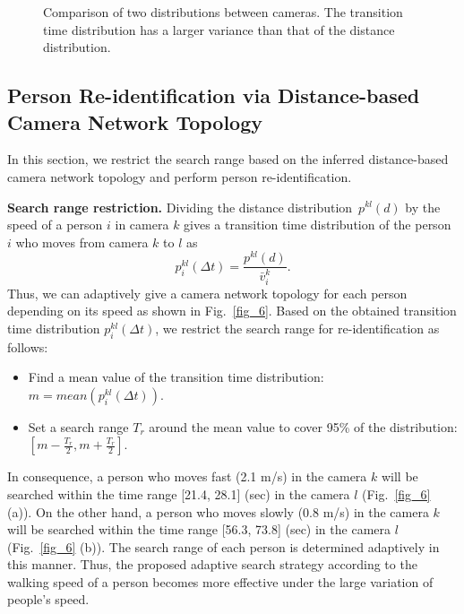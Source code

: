 \documentclass[10pt,twocolumn,letterpaper]{article}
\begin{document}
	
	\begin{figure}[t]	
		\centering
		\caption{Comparison of two distributions between cameras. The transition time distribution has a larger variance than that of the distance distribution.}
		\label{fig_5}
		
	\end{figure}
	
	
	\subsection{Person Re-identification via Distance-based Camera Network Topology}
	\label{subsec:re_id}
	
	In this section, we restrict the search range based on the inferred distance-based camera network topology and perform person re-identification.
	\vspace{3pt}
	
	\noindent \textbf{Search range restriction.} \quad	Dividing the distance distribution~$p^{kl}\left(d\right)$ by the speed of a person $i$ in camera $k$ gives a transition time distribution of the person $i$ who moves from camera $k$ to $l$ as
	\begin{equation}
	p^{kl}_{i}\left(\Delta t\right) = \frac{p^{kl}\left(d \right)}{\bar{ v }^k_{i}}. 
	\end{equation}
	Thus, we can adaptively give a camera network topology for each person depending on its speed as shown in Fig.~\ref{fig_6}.
	Based on the obtained transition time distribution $p^{kl}_{i}\left(\Delta t\right)$, we restrict the search range for re-identification as follows: \vspace{-3pt}
	\begin{itemize}
		\item Find a mean value of the transition time distribution: $m = mean\left(p^{kl}_{i}\left(\Delta t\right) \right)$.  \vspace{-3pt}
		\item Set a search range $T_r$ around the mean value to cover 95\% of the distribution: $[m-\frac{T_r}{2}, m+ \frac{T_r}{2}]$. \vspace{-3pt}
	\end{itemize}	
	In consequence, a person who moves fast (2.1 m/s) in the camera $k$ will be searched within the time range [21.4, 28.1] (sec) in the camera $l$ (Fig.~\ref{fig_6} (a)). On the other hand, a person who moves slowly (0.8 m/s) in the camera $k$ will be searched within the time range [56.3, 73.8] (sec) in the camera $l$ (Fig.~\ref{fig_6} (b)). The search range of each person is determined adaptively in this manner. 
	Thus, the proposed adaptive search strategy according to the walking speed of a person becomes more effective under the large variation of people's speed.
	
\end{document}
